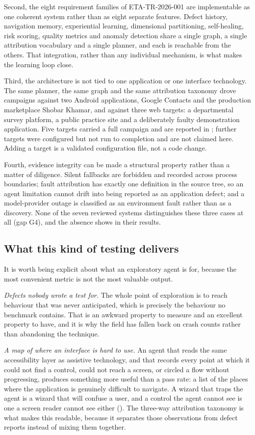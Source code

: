Second, the eight requirement families of ETA-TR-2026-001 are implementable as
one coherent system rather than as eight separate features. Defect history,
navigation memory, experiential learning, dimensional partitioning, self-healing,
risk scoring, quality metrics and anomaly detection share a single graph, a
single attribution vocabulary and a single planner, and each is reachable from
the others. That integration, rather than any individual mechanism, is what
makes the learning loop close.

Third, the architecture is not tied to one application or one interface
technology. The same planner, the same graph and the same attribution taxonomy
drove campaigns against two Android applications, Google Contacts and the
production marketplace Shobar Khamar, and against three web targets: a
departmental survey platform, a public practice site and a deliberately faulty
demonstration application. Five targets carried a full campaign and are
reported in ; further targets were configured but not run to
completion and are not claimed here. Adding a target is a validated
configuration file, not a code change.

Fourth, evidence integrity can be made a structural property rather than a
matter of diligence. Silent fallbacks are forbidden and recorded across process
boundaries; fault attribution has exactly one definition in the source tree, so
an agent limitation cannot drift into being reported as an application defect;
and a model-provider outage is classified as an environment fault rather than as
a discovery. None of the seven reviewed systems distinguishes these three cases
at all (gap G4), and the absence shows in their results.

\subsection*{What this kind of testing delivers}

It is worth being explicit about what an exploratory agent is for, because the
most convenient metric is not the most valuable output.

\emph{Defects nobody wrote a test for.} The whole point of exploration is to
reach behaviour that was never anticipated, which is precisely the behaviour no
benchmark contains. That is an awkward property to measure and an excellent
property to have, and it is why the field has fallen back on crash counts rather
than abandoning the technique.

\emph{A map of where an interface is hard to use.} An agent that reads the same
accessibility layer as assistive technology, and that records every point at
which it could not find a control, could not reach a screen, or circled a flow
without progressing, produces something more useful than a pass rate: a list of
the places where the application is genuinely difficult to navigate. A wizard
that traps the agent is a wizard that will confuse a user, and a control the
agent cannot see is one a screen reader cannot see either
(). The three-way attribution taxonomy is what makes this
readable, because it separates those observations from defect reports instead of
mixing them together.

